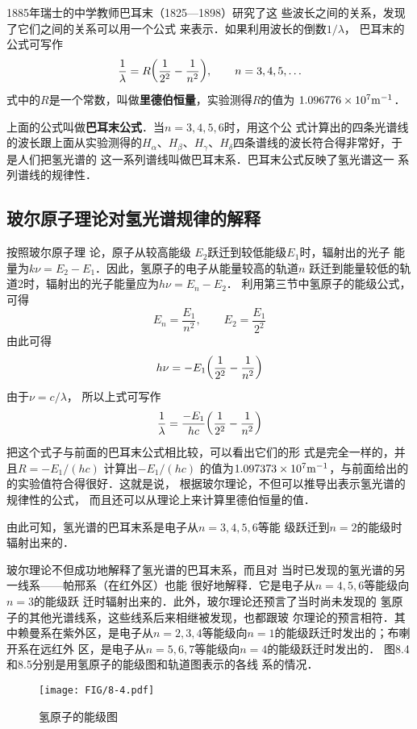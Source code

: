 1885年瑞士的中学教师巴耳末（1825—1898）研究了这
些波长之间的关系，发现了它们之间的关系可以用一个公式
来表示．如果利用波长的倒数$1/\lambda$，
巴耳末的公式可写作
\[\frac{1}{\lambda}=R\qty(\frac{1}{2^2}-\frac{1}{n^2}),\qquad n=3,4,5,\ldots\]
式中的$R$是一个常数，叫做\textbf{里德伯恒量}，实验测得$R$的值为
$1.096776\times10^7{\rm m^{-1}}$．

上面的公式叫做\textbf{巴耳末公式}．当$n=3,4,5,6$时，用这个公
式计算出的四条光谱线的波长跟上面从实验测得的$H_{\alpha}$、$H_{\beta}$、$H_{\gamma}$、$H_{\delta}$四条谱线的波长符合得非常好，于是人们把氢光谱的
这一系列谱线叫做巴耳末系．巴耳末公式反映了氢光谱这一
系列谱线的规律性．

\subsection{玻尔原子理论对氢光谱规律的解释} 

按照玻尔原子理
论，原子从较高能级 $E_2$跃迁到较低能级$E_1$时，辐射出的光子
能量为$k\nu =E_2-E_1$．因此，氢原子的电子从能量较高的轨道$n$
跃迁到能量较低的轨道2时，辐射出的光子能量应为$h\nu=E_n-E_2$．
利用第三节中氢原子的能级公式，可得
\[E_n=\frac{E_1}{n^2},\qquad E_2=\frac{E_1}{2^2} \]
由此可得\[h\nu=-E_1\qty( \frac{1}{2^2}-\frac{1}{n^2} )\]
由于$\nu=c/\lambda$，
所以上式可写作
\[\frac{1}{\lambda}=\frac{-E_1}{hc}\qty( \frac{1}{2^2}-\frac{1}{n^2})\]
把这个式子与前面的巴耳末公式相比较，可以看出它们的形
式是完全一样的，并且$R=-E_1/(hc)$
计算出$-E_1/(hc)$
的值为$1.097373\times10^7{\rm m^{-1}}$，与前面给出的的实验值符合得很好．这就是说，
根据玻尔理论，不但可以推导出表示氢光谱的规律性的公式，
而且还可以从理论上来计算里德伯恒量的值．

由此可知，氢光谱的巴耳末系是电子从$n=3,4,5,6$等能
级跃迁到$n=2$的能级时辐射出来的．

玻尔理论不但成功地解释了氢光谱的巴耳末系，而且对
当时已发现的氢光谱的另一线系——帕邢系（在红外区）也能
很好地解释．它是电子从$n=4,5,6$等能级向$n=3$的能级跃
迁时辐射出来的．此外，玻尔理论还预言了当时尚未发现的
氢原子的其他光谱线系，这些线系后来相继被发现，也都跟玻
尔理论的预言相符．其中赖曼系在紫外区，是电子从$n=2,
3,4$等能级向$n=1$的能级跃迁时发出的；布喇开系在远红外
区，是电子从$n=5,6,7$等能级向$n=4$的能级跃迁时发出的．
图8.4和8.5分别是用氢原子的能级图和轨道图表示的各线
系的情况．
\begin{figure}[htp]
    \centering
\texttt{[image: FIG/8-4.pdf]}
    \caption{氢原子的能级图}
\end{figure}

